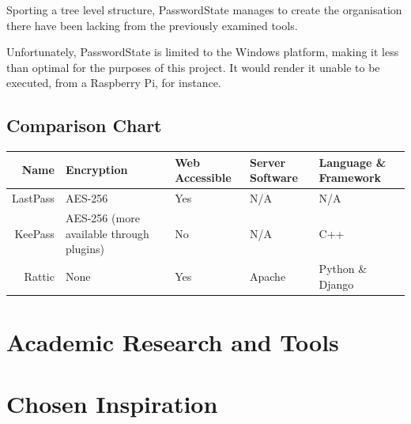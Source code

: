 			Sporting a tree level structure, PasswordState manages to create the organisation there have been lacking from the previously examined tools.

			Unfortunately, PasswordState is limited to the Windows platform, making it less than optimal for the purposes of this project. It would render it unable to be executed, from a Raspberry Pi, for instance.



		\subsection{Comparison Chart}
			\begin{table}
				\begin{tabular}{ r l l l l }
					Name 				& Encryption  & Web Accessible 		& Server Software 		& Language \& Framework 		\\
					\hline
					LastPass 			& AES-256 		& Yes			& N/A 				& N/A \\
					KeePass 			& AES-256 (more available through plugins) & No & N/A & C++ \\
					Rattic 				& None 			& Yes 			& Apache 		& Python \& Django \\
				\end{tabular}
			\end{table}



	\section{Academic Research and Tools}
	\section{Chosen Inspiration}
